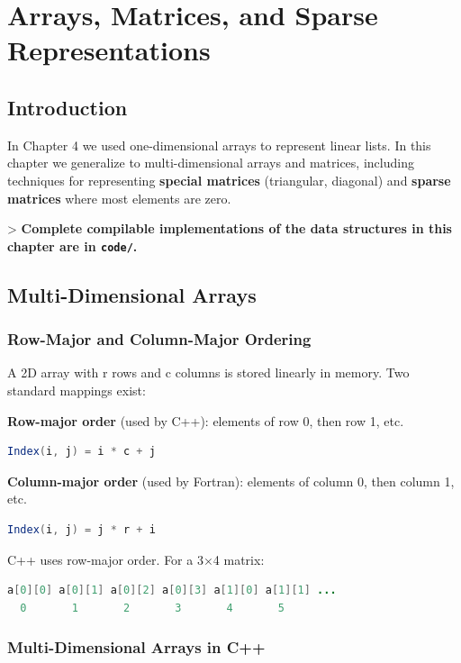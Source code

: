 \chapter{Arrays, Matrices, and Sparse Representations}\label{ch05:arrays-matrices-and-sparse-representations}

\section{Introduction}

In Chapter 4 we used one-dimensional arrays to represent linear lists. In this chapter we generalize to multi-dimensional arrays and matrices, including techniques for representing \textbf{special matrices} (triangular, diagonal) and \textbf{sparse matrices} where most elements are zero.

> \textbf{Complete compilable implementations of the data structures in this chapter are in \texttt{code/}.}

\section{Multi-Dimensional Arrays}

\subsection{Row-Major and Column-Major Ordering}

A 2D array with r rows and c columns is stored linearly in memory. Two standard mappings exist:

\textbf{Row-major order} (used by C++): elements of row 0, then row 1, etc.
\begin{lstlisting}[language=Java]
Index(i, j) = i * c + j
\end{lstlisting}

\textbf{Column-major order} (used by Fortran): elements of column 0, then column 1, etc.
\begin{lstlisting}[language=Java]
Index(i, j) = j * r + i
\end{lstlisting}

C++ uses row-major order. For a 3$\times $4 matrix:

\begin{lstlisting}[language=Java]
a[0][0] a[0][1] a[0][2] a[0][3] a[1][0] a[1][1] ...
  0       1       2       3       4       5
\end{lstlisting}

\subsection{Multi-Dimensional Arrays in C++}


